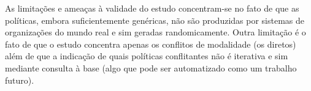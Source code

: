 As limitações e ameaças à validade do estudo concentram-se no fato de que as políticas, embora suficientemente genéricas, não são produzidas por sistemas de organizações do mundo real e sim geradas randomicamente. Outra limitação é o fato de que o estudo concentra apenas os conflitos de modalidade (os diretos) além de que a indicação de quais políticas conflitantes não é iterativa e sim mediante consulta à base (algo que pode ser automatizado como um trabalho futuro).

\clearpage
